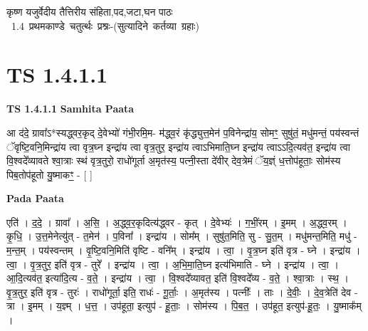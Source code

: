 \documentclass[17pt]{extarticle}
\begin{document}
\begin{titlepage}
    \begin{center}
 
\begin{sanskrit}
    { \Large
    कृष्ण यजुर्वेदीय तैत्तिरीय संहिता,पद,जटा,घन पाठः 
    }
    \\
    \vspace{2.5cm}
    \mbox{ \Large
    1.4     प्रथमकाण्डे चतुर्त्थः प्रश्नः-(सुत्यादिने कर्तव्या ग्रहाः)   }
\end{sanskrit}
\end{center}

\end{titlepage}
\tableofcontents
{}
\pagebreak


\section{ TS 1.4.1.1 }

\textbf{TS 1.4.1.1 } \newline
\textbf{Samhita Paata} \newline

आ द॑दे॒ ग्रावा᳚ऽ*स्यद्ध्वर॒कृद् दे॒वेभ्यो॑ गंभी॒रमि॒म- म॑द्ध्व॒रं कृ॑द्ध्युत्त॒मेन॑ प॒विनेन्द्रा॑य॒ सोमꣳ॒॒ सुषु॑तं॒ मधु॑मन्तं॒ पय॑स्वन्तं ॅवृष्टि॒वनि॒मिन्द्रा॑य त्वा वृत्र॒घ्न इन्द्रा॑य त्वा वृत्र॒तुर॒ इन्द्रा॑य त्वाऽभिमाति॒घ्न इन्द्रा॑य त्वाऽऽदि॒त्यव॑त॒ इन्द्रा॑य त्वा वि॒श्वदे᳚व्यावते श्वा॒त्राः स्थ॑ वृत्र॒तुरो॒ राधो॑गूर्ता अ॒मृत॑स्य॒ पत्नी॒स्ता दे॑वीर् देव॒त्रेमं ॅय॒ज्ञ्ं ध॒त्तोप॑हूताः॒ सोम॑स्य पिब॒तोप॑हूतो यु॒ष्माकꣳ॒॒ - [ ] \newline

\textbf{Pada Paata} \newline

एति॑ । द॒दे॒ । ग्रावा᳚ । अ॒सि॒ । अ॒द्ध्व॒र॒कृदित्य॑द्ध्वर - कृत् । दे॒वेभ्यः॑ । ग॒भीं॒रम् । इ॒मम् । अ॒द्ध्व॒रम् । कृ॒धि॒ । उ॒त्त॒मेनेत्यु॑त् - त॒मेन॑ । प॒विना᳚ । इन्द्रा॑य । सोम᳚म् । सुषु॑त॒मिति॒ सु - सु॒त॒म् । मधु॑मन्त॒मिति॒ मधु॑ - म॒न्त॒म् । पय॑स्वन्तम् । वृ॒ष्टि॒वनि॒मिति॑ वृष्टि - वनि᳚म् । इन्द्रा॑य । त्वा॒ । वृ॒त्र॒घ्न इति॑ वृत्र - घ्ने । इन्द्रा॑य । त्वा॒ । वृ॒त्र॒तुर॒ इति॑ वृत्र - तुरे᳚ । इन्द्रा॑य । त्वा॒ । अ॒भि॒मा॒ति॒घ्न इत्य॑भिमाति - घ्ने । इन्द्रा॑य । त्वा॒ । आ॒दि॒त्यव॑त॒ इत्या॑दि॒त्य - व॒ते॒ । इन्द्रा॑य । त्वा॒ । वि॒श्वदे᳚व्यावत॒ इति॑ वि॒श्वदे᳚व्य - व॒ते॒ । श्वा॒त्राः । स्थ॒ । वृ॒त्र॒तुर॒ इति॑ वृत्र - तुरः॑ । राधो॑गूर्ता॒ इति॒ राधः॑ - गू॒र्ताः॒ । अ॒मृत॑स्य । पत्नीः᳚ । ताः । दे॒वीः॒ । दे॒व॒त्रेति॑ देव - त्रा । इ॒मम् । य॒ज्ञ्म् । ध॒त्त॒ । उप॑हूता॒ इत्युप॑ - हू॒ताः॒ । सोम॑स्य । पि॒ब॒त॒ । उप॑हूत॒ इत्युप॑-हू॒तः॒ । यु॒ष्माक᳚म् ।  \newline
\end{document}
